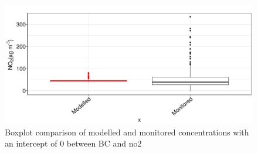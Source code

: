 \begin{figure}[H]
\centering
\includegraphics[scale=0.4]{images/grouped_journey_boxplots_new_intercept.png}
\caption{Boxplot comparison of modelled and monitored concentrations with an intercept of 0 between BC and \gls{no2}}
\label{fig:grouped_journey_boxplots_new_intercept}
\end{figure}

